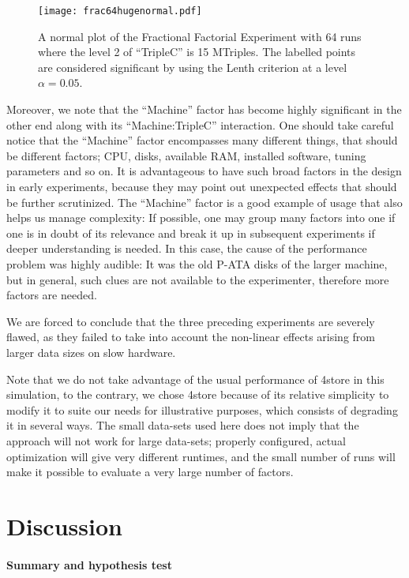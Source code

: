 \documentclass{article}
\begin{document}
\begin{figure}[h!]
  \texttt{[image: frac64hugenormal.pdf]}
  \caption{A normal plot of the Fractional Factorial Experiment with
    64 runs where the level 2 of ``TripleC'' is 15 MTriples. The
    labelled points are considered significant by using the Lenth
    criterion at a level $\alpha=0.05$.}\label{fig:frac64hugenormal}
\end{figure}


Moreover, we note that the ``Machine'' factor has become highly
significant in the other end along with its ``Machine:TripleC''
interaction. One should take careful notice that the ``Machine''
factor encompasses many different things, that should be different
factors; CPU, disks, available RAM, installed software, tuning
parameters and so on. It is advantageous to have such broad factors in
the design in early experiments, because they may point out unexpected
effects that should be further scrutinized. The ``Machine'' factor is
a good example of usage that also helps us manage complexity: If
possible, one may group many factors into one if one is in doubt of
its relevance and break it up in subsequent experiments if deeper
understanding is needed. In this case, the cause of the performance
problem was highly audible: It was the old P-ATA disks of the larger
machine, but in general, such clues are not available to the
experimenter, therefore more factors are needed.

We are forced to conclude that the three preceding experiments are
severely flawed, as they failed to take into account the non-linear
effects arising from larger data sizes on slow hardware. 


Note that we do not take advantage of the usual performance of 4store
in this simulation, to the contrary, we chose 4store because of its
relative simplicity to modify it to suite our needs for illustrative
purposes, which consists of degrading it in several ways. The small
data-sets used here does not imply that the approach will not work for
large data-sets; properly configured, actual optimization will give
very different runtimes, and the small number of runs will make it
possible to evaluate a very large number of factors.



\section{Discussion}

\paragraph{Summary and hypothesis test}
\end{document}
